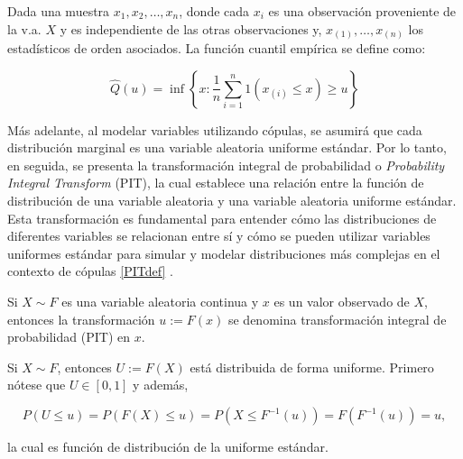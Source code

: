 \begin{defn}
    Dada una muestra $x_1, x_2, \dots, x_n$, donde cada $x_i$ es una observación proveniente de la v.a. $X$ y es independiente de las otras observaciones y, $x_{(1)}, \dots, x_{(n)}$ los estadísticos de orden asociados. La función cuantil empírica se define como:

    \begin{equation}
        \widehat{Q}(u) =  \inf \left\{ x: \frac{1}{n}\sum _{i = 1}^{n}  1(x_{(i)} \leq x) \geq u\right\} 
    \end{equation}
\end{defn}

Más adelante, al modelar variables utilizando cópulas, se asumirá que cada distribución marginal es una variable aleatoria uniforme estándar. Por lo tanto, en seguida, se presenta la transformación integral de probabilidad o \textit{Probability Integral Transform} (PIT), la cual establece una relación entre la función de distribución de una variable aleatoria y una variable aleatoria uniforme estándar. Esta transformación es fundamental para entender cómo las distribuciones de diferentes variables se relacionan entre sí y cómo se pueden utilizar variables uniformes estándar para simular y modelar distribuciones más complejas en el contexto de cópulas \ref{PITdef} \cite{CopulasR}.

\begin{defn}\label{PITdef}
    Si $X \sim F$ es una variable aleatoria continua y $x$ es un valor observado de $X$, entonces la transformación $u := F(x)$ se denomina transformación integral de probabilidad (PIT) en $x$.
\end{defn}

\begin{obs}\label{PITdist}
    Si $X \sim F$, entonces $U := F(X)$ está distribuida de forma uniforme. Primero nótese que $U \in [0, 1]$ y además, 

    \begin{equation}
        P(U \leq u)=P(F(X) \leq u)=P\left(X \leq F^{-1}(u)\right)=F\left(F^{-1}(u)\right)=u,
    \end{equation}

    la cual es función de distribución de la uniforme estándar.
\end{obs}



